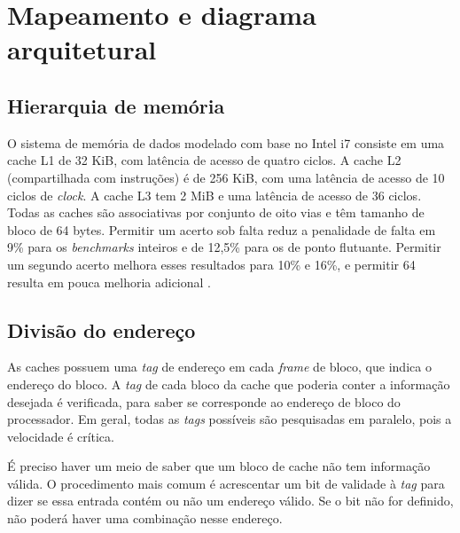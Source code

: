 \chapter{Mapeamento e diagrama arquitetural}
\label{cap:diagramas}

\section{Hierarquia de memória}
O sistema de memória de dados modelado com base no Intel i7 consiste em uma cache L1 de 32 KiB, com latência de acesso de quatro ciclos. A cache L2 (compartilhada com instruções) é de 256 KiB, com uma latência de acesso de 10 ciclos de \textit{clock}. A cache L3 tem 2 MiB e uma latência de acesso de 36 ciclos. Todas as caches são associativas por conjunto de oito vias e têm tamanho de bloco de 64 bytes. Permitir um acerto sob falta reduz a penalidade de falta em 9\% para os \textit{benchmarks} inteiros e de 12,5\% para os de ponto flutuante. Permitir um segundo acerto melhora esses resultados para 10\% e 16\%, e permitir 64 resulta em pouca melhoria adicional \cite{hennessy2019}.

\section{Divisão do endereço}
As caches possuem uma \textit{tag} de endereço em cada \textit{frame} de bloco, que indica o endereço do bloco. A \textit{tag} de cada bloco da cache que poderia conter a informação desejada é verificada, para saber se corresponde ao endereço de bloco do processador. Em geral, todas as \textit{tags} possíveis são pesquisadas em paralelo, pois a velocidade é crítica.

É preciso haver um meio de saber que um bloco de cache não tem informação válida. O procedimento mais comum é acrescentar um bit de validade à \textit{tag} para dizer se essa entrada contém ou não um endereço válido. Se o bit não for definido, não poderá haver uma combinação nesse endereço.

